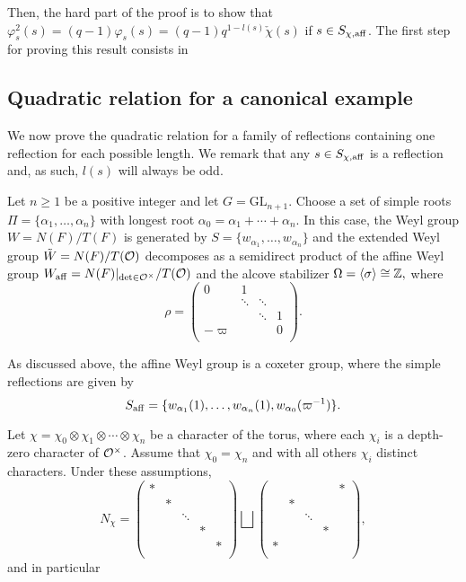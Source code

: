     Then, the hard part of the proof is to show that $\varphi_s^2(s)=(q-1)\varphi_s(s)=(q-1)q^{1-l(s)}\check{\chi}(s)$ if $s\in S_{\chi,\mathrm{aff}}$.
    The first step for proving this result consists in 

    \subsection{Quadratic relation for a canonical example}
    We now prove the quadratic relation for a family of reflections containing one reflection for each possible length. We remark that any $s\in S_{\chi,\mathrm{aff}}$ is a reflection and, as such, $l(s)$ will always be odd.

    Let $n\geq1$ be a positive integer and let $G=\mathrm{GL}_{n+1}$. Choose a set of simple roots $\Pi=\{\alpha_1,\ldots,\alpha_n\}$ with longest root $\alpha_0=\alpha_1+\cdots+\alpha_n$. In this case, the Weyl group $W=N(F)/T(F)$ is generated by $S=\{w_{\alpha_1},\ldots,w_{\alpha_n}\}$ and the extended Weyl group $\tilde{W}=N(F)/T(\mathcal{O})$ decomposes as a semidirect product of the affine Weyl group $W_{\mathrm{aff}}=N(F)|_{\det\in\mathcal{O}^\times}/T(\mathcal{O})$ and the alcove stabilizer $\Omega=\langle\sigma\rangle\cong\mathbb{Z},$ where
    $$\rho=\begin{pmatrix}
        0&1&&\\
        &\ddots&\ddots&\\
        &&\ddots&1\\
        -\varpi &&&0\\
    \end{pmatrix}.$$

    As discussed above, the affine Weyl group is a coxeter group, where the simple reflections are given by 
    $$S_{\mathrm{aff}}=\{w_{\alpha_1}(1),\ldots,w_{\alpha_n}(1),w_{\alpha_0}(\varpi^{-1})\}.$$

    Let $\chi=\chi_0\otimes\chi_1\otimes\cdots\otimes\chi_n$ be a character of the torus, where each $\chi_i$ is a depth-zero character of $\mathcal{O}^\times$. Assume that $\chi_0=\chi_n$ and with all others $\chi_i$ distinct characters. Under these assumptions, 
    $$N_\chi=\begin{pmatrix}
        *&&&&\\
        &*&&&\\
        &&\ddots&&\\
        &&&*&\\
        &&&&*\\
    \end{pmatrix}\bigsqcup\begin{pmatrix}
        &&&&*\\
        &*&&&\\
        &&\ddots&&\\
        &&&*&\\
        *&&&&\\
    \end{pmatrix},$$
    and in particular

